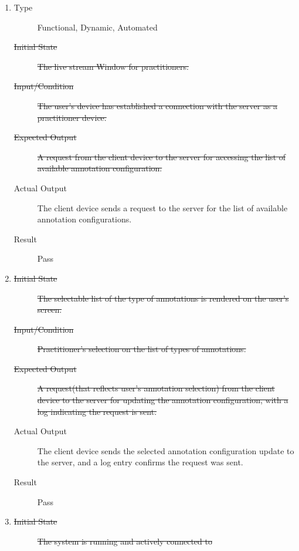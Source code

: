 \documentclass[12pt, titlepage]{article}
\begin{document}
\begin{enumerate}[FR-T1]
  \item \label{FRT4}
    \begin{description}
    \item[Type] Functional, Dynamic, Automated
    \item[\sout{Initial State}]\sout{ The live stream Window for practitioners.
    }
		\item[\sout{Input/Condition}]\sout{ The user’s device has established a connection with the
      server as a practitioner device.
    }
		\item[\sout{Expected Output}]\sout{ A request from the client device to the server for
      accessing the list of available annotation configuration.
    }
		\item[Actual Output] The client device sends a request to the server for the
      list of available annotation configurations.
    \item[Result] Pass
    \end{description}
  \item \label{FRT5}
    \begin{description}
    \item[\sout{Initial State}]\sout{ The selectable list of the type of annotations is
      rendered on the user's screen.
    }
		\item[\sout{Input/Condition}]\sout{ Practitioner’s selection on the list of types of
      annotations.
    }
		\item[\sout{Expected Output}]\sout{ A request(that reflects user’s annotation selection)
      from the client device to the server for updating the annotation
      configuration, with a log indicating the request is sent.
    }
		\item[Actual Output] The client device sends the selected annotation
      configuration update to the server, and a log entry confirms the request
      was sent.
    \item[Result] Pass
    \end{description}
  \item \label{FRT6}
    \begin{description}
    \item[\sout{Initial State}]\sout{ The system is running and actively connected to
}
\end{description}
\end{enumerate}
\end{document}
